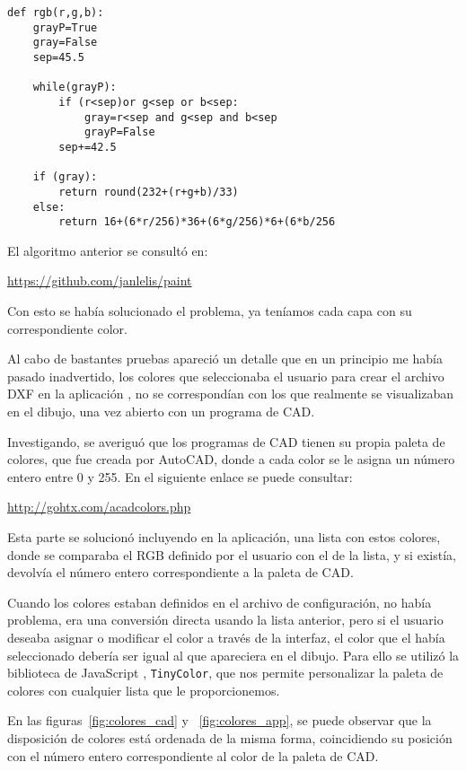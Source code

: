 \begin{verbatim}
def rgb(r,g,b):
    grayP=True
    gray=False
    sep=45.5

    while(grayP):
        if (r<sep)or g<sep or b<sep:
            gray=r<sep and g<sep and b<sep
            grayP=False
        sep+=42.5

    if (gray):
        return round(232+(r+g+b)/33)
    else:
        return 16+(6*r/256)*36+(6*g/256)*6+(6*b/256
\end{verbatim}

El algoritmo anterior se consultó en:

\url{https://github.com/janlelis/paint} 

Con esto se había solucionado el problema, ya teníamos cada capa con su correspondiente color.

Al cabo de bastantes pruebas apareció un detalle que en un principio me había pasado inadvertido, los colores que seleccionaba el usuario para crear el archivo DXF en la aplicación , no se correspondían con los que realmente se visualizaban en el dibujo, una vez abierto con un programa de CAD.

Investigando, se averiguó que los programas de CAD tienen su propia paleta de colores, que fue creada por AutoCAD, donde a cada color se le asigna un número entero entre 0 y 255. En el siguiente enlace se puede consultar:


\url{http://gohtx.com/acadcolors.php}

Esta parte se solucionó incluyendo en la aplicación, una lista con estos colores, donde se comparaba el RGB definido por el usuario con el de la lista, y si existía, devolvía el número entero correspondiente a la paleta de CAD.

Cuando los colores estaban definidos en el archivo de configuración, no había problema, era una conversión directa usando la lista anterior, pero si el usuario deseaba asignar o modificar el color a través de la interfaz, el color que el había seleccionado debería ser igual al que apareciera en el dibujo. Para ello se utilizó la biblioteca de JavaScript , \texttt{TinyColor}, que nos permite personalizar la paleta de colores con cualquier lista que le proporcionemos.



En las figuras~\ref{fig:colores_cad} y ~\ref{fig:colores_app}, se puede observar que la disposición de colores está ordenada de la misma forma, coincidiendo su posición con el número entero correspondiente al color de la paleta de CAD.

